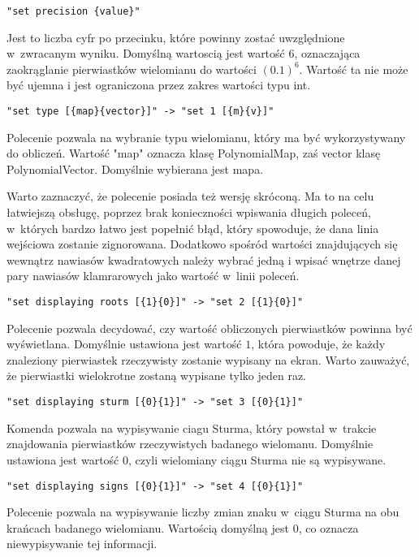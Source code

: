 \begin{lstlisting}
"set precision {value}"
\end{lstlisting}

Jest to liczba cyfr po przecinku, które powinny zostać uwzględnione w~zwracanym wyniku. Domyślną wartoscią jest wartość $6$, oznaczająca zaokrąglanie pierwiastków wielomianu do wartości $(0.1)^6$. Wartość ta nie może być ujemna i jest ograniczona przez zakres wartości typu int.

\begin{lstlisting}
"set type [{map}{vector}]" -> "set 1 [{m}{v}]"
\end{lstlisting}

Polecenie pozwala na wybranie typu wielomianu, który ma być wykorzystywany do obliczeń. Wartość "map" oznacza klasę PolynomialMap, zaś vector klasę PolynomialVector. Domyślnie wybierana jest mapa.

Warto zaznaczyć, że polecenie posiada też wersję skróconą. Ma to na celu łatwiejszą obsługę, poprzez brak konieczności wpiswania długich poleceń, w~których bardzo łatwo jest popełnić błąd, który spowoduje, że dana linia wejściowa zostanie zignorowana. Dodatkowo spośród wartości znajdujących się wewnątrz nawiasów kwadratowych należy wybrać jedną i wpisać wnętrze danej pary nawiasów klamrarowych jako wartość w~linii poleceń.

\begin{lstlisting}
"set displaying roots [{1}{0}]" -> "set 2 [{1}{0}]"
\end{lstlisting}
Polecenie pozwala decydować, czy wartość obliczonych pierwiastków powinna być wyświetlana. Domyślnie ustawiona jest wartość $1$, która powoduje, że każdy znaleziony pierwiastek rzeczywisty zostanie wypisany na ekran. Warto zauważyć, że pierwiastki wielokrotne zostaną wypisane tylko jeden raz.

\begin{lstlisting}
"set displaying sturm [{0}{1}]" -> "set 3 [{0}{1}]"
\end{lstlisting}

Komenda pozwala na wypisywanie ciagu Sturma, który powstał w~trakcie znajdowania pierwiastków rzeczywistych badanego wielomanu. Domyślnie ustawiona jest wartość $0$, czyli wielomiany ciągu Sturma nie są wypisywane.

\begin{lstlisting}
"set displaying signs [{0}{1}]" -> "set 4 [{0}{1}]"
\end{lstlisting}

Polecenie pozwala na wypisywanie liczby zmian znaku w~ciągu Sturma na obu krańcach badanego wielomianu. Wartością domyślną jest $0$, co oznacza niewypisywanie tej informacji.

